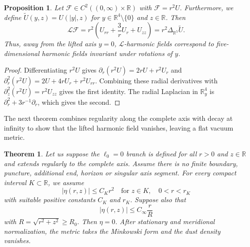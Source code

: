 \documentclass[amsmath,amsfonts,amssymb,aps,pra,superscriptaddress,10pt]{revtex4-2}
\numberwithin{equation}{section}
\theoremstyle{plain}
\newtheorem{theorem}{Theorem}
\newtheorem{proposition}{Proposition}
\theoremstyle{definition}
\theoremstyle{remark}
\theoremstyle{definition}
\newcommand{\ellzero}{\ell_0}
\begin{document}
\begin{proposition}
Let $\mathcal{F}\in C^2((0,\infty)\times\mathbb{R})$ with $\mathcal{F}=r^2 U$. Furthermore, we define $\widetilde{U}(y,z)=U(|y|,z)$ for $y\in\mathbb{R}^4\setminus\{0\}$ and $z\in\mathbb{R}$. Then
\begin{equation}
\mathcal{L}\mathcal{F}=r^2\left(U_{rr}+\frac{3}{r}U_r+U_{zz}\right)
=r^2\Delta_{\mathbb{R}^5}\widetilde{U}.
\end{equation}
Thus, away from the lifted axis $y=0$, $\mathcal{L}$-harmonic fields correspond to five-dimensional harmonic fields invariant under rotations of $y$.
\end{proposition}

\begin{proof}
Differentiating $r^2 U$ gives $\partial_r(r^2 U)=2rU+r^2U_r$ and
$\partial_r^2(r^2U)=2U+4rU_r+r^2U_{rr}$. Combining these radial derivatives with $\partial_z^2(r^2U)=r^2U_{zz}$ gives the first identity. The radial Laplacian in $\mathbb{R}^4_y$ is $\partial_r^2+3r^{-1}\partial_r$, which gives the second.
\end{proof}

The next theorem combines regularity along the complete axis with decay at infinity to show that the lifted harmonic field vanishes, leaving a flat vacuum metric.

\begin{theorem}
Let us suppose the $\ellzero=0$ branch is defined for all $r>0$ and
$z\in\mathbb{R}$ and extends regularly to the complete axis. Assume there is no finite boundary, puncture, additional end, horizon or singular axis segment. For every compact interval $K\subset\mathbb{R}$, we assume
\begin{equation}
|\eta(r,z)|\leq C_Kr^2\quad\text{for }z\in K,\quad 0<r<r_K
\end{equation}
with suitable positive constants $C_K$ and $r_K$. Suppose also that
\begin{equation}
|\eta(r,z)|\leq C_\infty\frac{r}{R}
\end{equation}
with $R=\sqrt{r^2+z^2}\geq R_0$. Then $\eta=0$. After stationary and meridional normalization, the metric takes the Minkowski form and the dust density vanishes.
\end{theorem}
\end{document}
